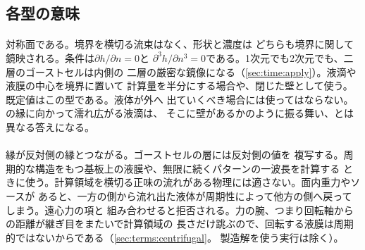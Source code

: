 \subsection{各型の意味}

\paragraph{} 対称面である。境界を横切る流束はなく、形状と濃度は
どちらも境界に関して鏡映される。条件は$\partial h/\partial n = 0$と
$\partial^3 h/\partial n^3 = 0$である。1次元でも2次元でも、二層のゴーストセルは内側の
二層の厳密な鏡像になる（\cref{sec:time:apply}）。液滴や液膜の中心を境界に置いて
計算量を半分にする場合や、閉じた壁として使う。既定値はこの型である。液体が外へ
出ていくべき場合には使ってはならない。の縁に向かって濡れ広がる液滴は、
そこに壁があるかのように振る舞い、とは異なる答えになる。

\paragraph{} 縁が反対側の縁とつながる。ゴーストセルの層には反対側の値を
複写する。周期的な構造をもつ基板上の液膜や、無限に続くパターンの一波長を計算する
ときに使う。計算領域を横切る正味の流れがある物理には適さない。面内重力やソースが
あると、一方の側から流れ出た液体が周期性によって他方の側へ戻ってしまう。遠心力の項と
組み合わせると拒否される。力の腕、つまり回転軸からの距離が継ぎ目をまたいで計算領域の
長さだけ跳ぶので、回転する液膜は周期的ではないからである（\cref{sec:terms:centrifugal}。
製造解を使う実行は除く）。

